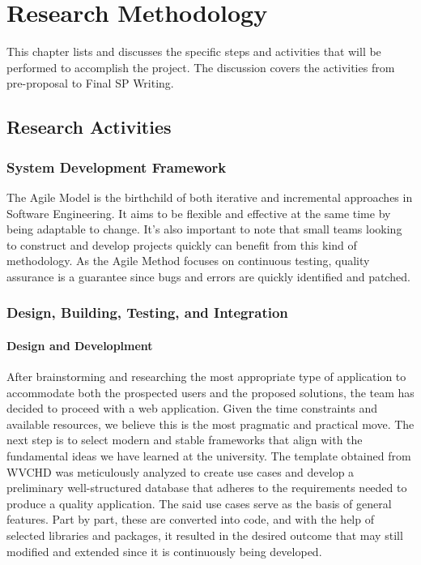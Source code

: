 \chapter{Research Methodology}
This chapter lists and discusses the specific steps and activities that will be performed to accomplish the project. 
The discussion covers the activities from pre-proposal to Final SP Writing.

\section{Research Activities}

\subsection{System Development Framework}
The Agile Model is the birthchild of both iterative and incremental approaches in Software Engineering. It aims to be flexible and effective at the same time by being adaptable to change. It's also important to note that small teams looking to construct and develop projects quickly can benefit from this kind of methodology. As the Agile Method focuses on continuous testing, quality assurance is a guarantee since bugs and errors are quickly identified and patched. 

\subsection{Design, Building, Testing, and Integration}
\subsubsection{Design and Developlment}
After brainstorming and researching the most appropriate type of application to accommodate both the prospected users and the proposed solutions, the team has decided to proceed with a web application. Given the time constraints and available resources, we believe this is the most pragmatic and practical move. The next step is to select modern and stable frameworks that align with the fundamental ideas we have learned at the university. The template obtained from WVCHD was meticulously analyzed to create use cases and develop a preliminary well-structured database that adheres to the requirements needed to produce a quality application. The said use cases serve as the basis of general features. Part by part, these are converted into code, and with the help of selected libraries and packages, it resulted in the desired outcome that may still modified and extended since it is continuously being developed. 


